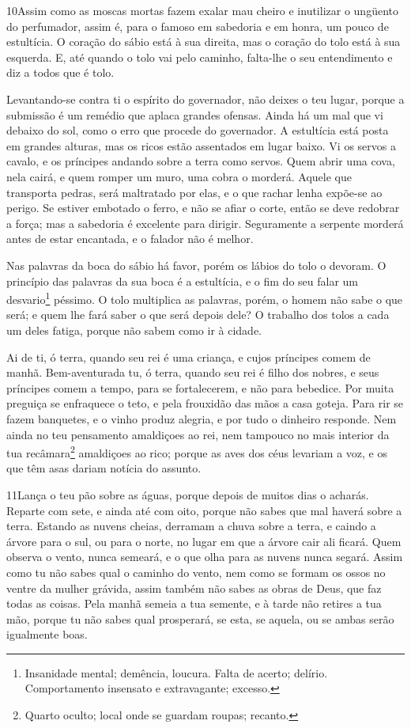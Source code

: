 \medskip

\lettrine{10} Assim como as moscas mortas fazem exalar mau
cheiro e inutilizar o ungüento do perfumador, assim é, para o famoso
em sabedoria e em honra, um pouco de estultícia. O coração do
sábio está à sua direita, mas o coração do tolo está à sua esquerda.
E, até quando o tolo vai pelo caminho, falta-lhe o seu
entendimento e diz a todos que é tolo.

Levantando-se contra ti o espírito do governador, não deixes o teu
lugar, porque a submissão é um remédio que aplaca grandes ofensas.
Ainda há um mal que vi debaixo do sol, como o erro que procede
do governador. A estultícia está posta em grandes alturas, mas
os ricos estão assentados em lugar baixo. Vi os servos a cavalo,
e os príncipes andando sobre a terra como servos. Quem abrir uma
cova, nela cairá, e quem romper um muro, uma cobra o morderá.
Aquele que transporta pedras, será maltratado por elas, e o que
rachar lenha expõe-se ao perigo. Se estiver embotado o ferro,
e não se afiar o corte, então se deve redobrar a força; mas a
sabedoria é excelente para dirigir. Seguramente a serpente
morderá antes de estar encantada, e o falador não é melhor.

Nas palavras da boca do sábio há favor, porém os lábios do tolo o
devoram. O princípio das palavras da sua boca é a estultícia,
e o fim do seu falar um desvario\footnote{Insanidade mental;
demência, loucura. Falta de acerto; delírio. Comportamento insensato
e extravagante; excesso.} péssimo. O tolo multiplica as
palavras, porém, o homem não sabe o que será; e quem lhe fará saber
o que será depois dele? O trabalho dos tolos a cada um deles
fatiga, porque não sabem como ir à cidade.

Ai de ti, ó terra, quando seu rei é uma criança, e cujos
príncipes comem de manhã. Bem-aventurada tu, ó terra, quando
seu rei é filho dos nobres, e seus príncipes comem a tempo, para se
fortalecerem, e não para bebedice. Por muita preguiça se
enfraquece o teto, e pela frouxidão das mãos a casa goteja.
Para rir se fazem banquetes, e o vinho produz alegria, e por
tudo o dinheiro responde. Nem ainda no teu pensamento
amaldiçoes ao rei, nem tampouco no mais interior da tua
recâmara\footnote{Quarto oculto; local onde se guardam roupas;
recanto.} amaldiçoes ao rico; porque as aves dos céus levariam a
voz, e os que têm asas dariam notícia do assunto.

\medskip

\lettrine{11} Lança o teu pão sobre as águas, porque depois de
muitos dias o acharás. Reparte com sete, e ainda até com oito,
porque não sabes que mal haverá sobre a terra. Estando as nuvens
cheias, derramam a chuva sobre a terra, e caindo a árvore para o
sul, ou para o norte, no lugar em que a árvore cair ali ficará.
Quem observa o vento, nunca semeará, e o que olha para as nuvens
nunca segará. Assim como tu não sabes qual o caminho do vento,
nem como se formam os ossos no ventre da mulher grávida, assim
também não sabes as obras de Deus, que faz todas as coisas. Pela
manhã semeia a tua semente, e à tarde não retires a tua mão, porque
tu não sabes qual prosperará, se esta, se aquela, ou se ambas serão
igualmente boas.

